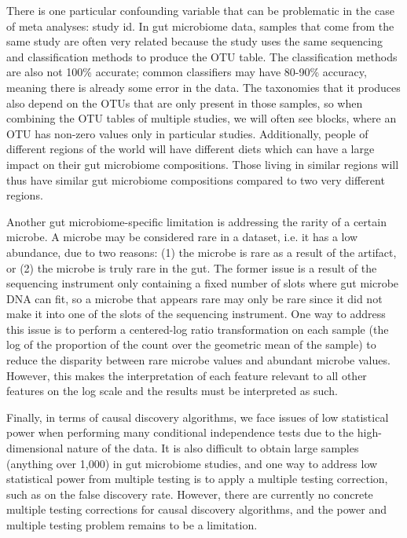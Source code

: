\documentclass[12pt,letterpaper]{article}
\begin{document}
There is one particular confounding variable that can be problematic in the case of meta analyses: study id. In gut microbiome data, samples that come from the same study are often very related because the study uses the same sequencing and classification methods to produce the OTU table. The classification methods are also not 100\% accurate; common classifiers may have 80-90\% accuracy, meaning there is already some error in the data. The taxonomies that it produces also depend on the OTUs that are only present in those samples, so when combining the OTU tables of multiple studies, we will often see blocks, where an OTU has non-zero values only in particular studies. Additionally, people of different regions of the world will have different diets which can have a large impact on their gut microbiome compositions. Those living in similar regions will thus have similar gut microbiome compositions compared to two very different regions. 

Another gut microbiome-specific limitation is addressing the rarity of a certain microbe. A microbe may be considered rare in a dataset, i.e. it has a low abundance, due to two reasons: (1) the microbe is rare as a result of the artifact, or (2) the microbe is truly rare in the gut. The former issue is a result of the sequencing instrument only containing a fixed number of slots where gut microbe DNA can fit, so a microbe that appears rare may only be rare since it did not make it into one of the slots of the sequencing instrument. One way to address this issue is to perform a centered-log ratio transformation on each sample (the log of the proportion of the count over the geometric mean of the sample) to reduce the disparity between rare microbe values and abundant microbe values. However, this makes the interpretation of each feature relevant to all other features on the log scale and the results must be interpreted as such. 

Finally, in terms of causal discovery algorithms, we face issues of low statistical power when performing many conditional independence tests due to the high-dimensional nature of the data. It is also difficult to obtain large samples (anything over 1,000) in gut microbiome studies, and one way to address low statistical power from multiple testing is to apply a multiple testing correction, such as on the false discovery rate. However, there are currently no concrete multiple testing corrections for causal discovery algorithms, and the power and multiple testing problem remains to be a limitation.
\end{document}
